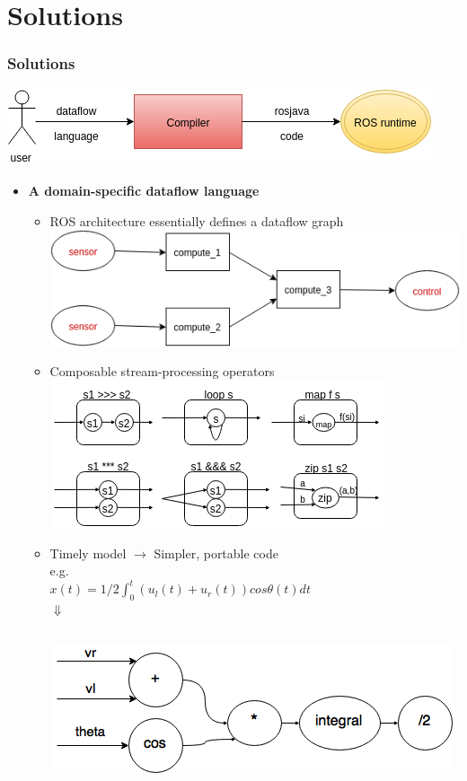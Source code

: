 \documentclass[hyperref={pdfpagelayout=SinglePage}]{beamer}
\begin{document}
\section{Solutions}
	\begin{frame}[allowframebreaks] \frametitle{Solutions}
		\includegraphics[scale=0.65]{pics/model.png}
		\begin{itemize}
		\item \textbf{A domain-specific dataflow language}
			\begin{itemize}
			\item ROS architecture essentially defines a dataflow graph	\\
			\includegraphics[scale=0.4]{pics/ros_dataflow.png}
			\item Composable stream-processing operators \\ 
			\includegraphics[scale=0.7]{pics/streams.png}
			\framebreak
			\item Timely model $\rightarrow$ Simpler, portable code	\\
			e.g. \\
			\hspace{20pt} $x(t) = 1/2 \int_{0}^{t}(u_l(t)+u_r(t))cos\theta(t)dt$ \\
			\hspace{60pt} $\Downarrow$ \\
			\inputminted[fontsize=\scriptsize]{hs}{code/time.hs}
			\includegraphics[scale=0.5]{pics/time.png} 

\end{itemize}
\end{itemize}
\end{frame}
\end{document}
